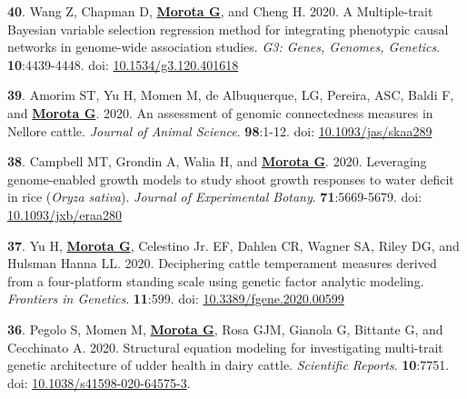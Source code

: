 \documentclass[margin,line,10pt]{res}
\newenvironment{list1}{
  \begin{list}{\ding{113}}{%
      \setlength{\itemsep}{0in}
      \setlength{\parsep}{0in} \setlength{\parskip}{0in}
      \setlength{\topsep}{0in} \setlength{\partopsep}{0in} 
      \setlength{\leftmargin}{0.17in}}}{\end{list}}
\begin{document}
\begin{resume}
\begin{list1}
  \item [{\bf 40}.] Wang Z, Chapman D, \textbf{\underline{Morota G}}, and Cheng H. 2020. A Multiple-trait Bayesian variable selection regression method for integrating phenotypic causal networks in genome-wide association studies. \emph{G3: Genes, Genomes, Genetics}. \textbf{10}:4439-4448. doi: \textcolor{blue}{\href{https://doi.org/10.1534/g3.120.401618}{10.1534/g3.120.401618}}

  \vspace{0.5cm}

\item [{\bf 39}.] Amorim ST, Yu H, Momen M, de Albuquerque, LG, Pereira, ASC, Baldi F, and \textbf{\underline{Morota G}}. 2020. An assessment of genomic connectedness measures in Nellore cattle. \emph{Journal of Animal Science}.  \textbf{98}:1-12.  doi: \textcolor{blue}{\href{https://doi.org/10.1093/jas/skaa289}{10.1093/jas/skaa289}} 

  \vspace{0.5cm}

\item  [{\bf 38}.]  Campbell MT, Grondin A, Walia H, and \textbf{\underline{Morota G}}. 2020. Leveraging genome-enabled growth models to study shoot growth responses to water deficit in rice ({\it Oryza sativa}). \emph{Journal of Experimental Botany}. \textbf{71}:5669-5679. doi: \textcolor{blue}{\href{https://doi.org/10.1093/jxb/eraa280}{10.1093/jxb/eraa280}}

    \vspace{0.5cm}
    
\item [{\bf 37}.] Yu H, \textbf{\underline{Morota G}}, Celestino Jr. EF, Dahlen CR, Wagner SA, Riley DG, and Hulsman Hanna LL. 2020. Deciphering cattle temperament measures derived from a four-platform standing scale using genetic factor analytic modeling. \emph{Frontiers in Genetics}. \textbf{11}:599. doi: \textcolor{blue}{\href{https://doi.org/10.3389/fgene.2020.00599}{10.3389/fgene.2020.00599}}

  \vspace{0.5cm}

    
\item [{\bf 36}.] Pegolo S, Momen M, \textbf{\underline{Morota G}}, Rosa GJM, Gianola G, Bittante G, and Cecchinato A. 2020. Structural equation modeling for investigating multi-trait genetic architecture of udder health in dairy cattle. \emph{Scientific Reports}. \textbf{10}:7751. doi: \textcolor{blue}{\href{https://doi.org/10.1038/s41598-020-64575-3}{10.1038/s41598-020-64575-3}}. 


\end{list1}
\end{resume}
\end{document}
